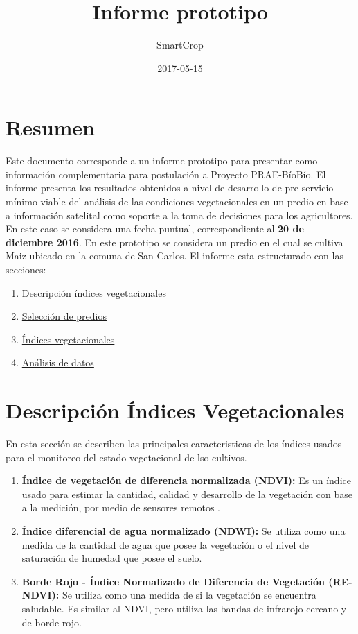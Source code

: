 \documentclass[]{report}
\title{Informe prototipo}
\author{SmartCrop}
\date{2017-05-15}
\providecommand{\tightlist}{%
  \setlength{\itemsep}{0pt}\setlength{\parskip}{0pt}}
\begin{document}
\maketitle

{
\setcounter{tocdepth}{1}
\tableofcontents
}
\chapter{Resumen}\label{resumen}

Este documento corresponde a un informe prototipo para presentar como
información complementaria para postulación a Proyecto PRAE-BíoBío. El
informe presenta los resultados obtenidos a nivel de desarrollo de
pre-servicio mínimo viable del análisis de las condiciones
vegetacionales en un predio en base a información satelital como soporte
a la toma de decisiones para los agricultores. En este caso se considera
una fecha puntual, correspondiente al \textbf{20 de diciembre 2016}. En
este prototipo se considera un predio en el cual se cultiva Maiz ubicado
en la comuna de San Carlos. El informe esta estructurado con las
secciones:

\begin{enumerate}
\def\labelenumi{\arabic{enumi}.}
\tightlist
\item
  \protect\hyperlink{DescripcionVIs}{Descripción índices vegetacionales}
\item
  \protect\hyperlink{SelecPredios}{Selección de predios}
\item
  \protect\hyperlink{indicesVeg}{Índices vegetacionales}
\item
  \protect\hyperlink{AnalisisDatos}{Análisis de datos}
\end{enumerate}

\hypertarget{DescripcionVIs}{\chapter{Descripción Índices
Vegetacionales}\label{DescripcionVIs}}

En esta sección se describen las principales caracteristicas de los
índices usados para el monitoreo del estado vegetacional de lso
cultivos.

\begin{enumerate}
\def\labelenumi{\arabic{enumi}.}
\item
  \textbf{Índice de vegetación de diferencia normalizada (NDVI):} Es un
  índice usado para estimar la cantidad, calidad y desarrollo de la
  vegetación con base a la medición, por medio de sensores remotos .
\item
  \textbf{Índice diferencial de agua normalizado (NDWI):} Se utiliza
  como una medida de la cantidad de agua que posee la vegetación o el
  nivel de saturación de humedad que posee el suelo.
\item
  \textbf{Borde Rojo - Índice Normalizado de Diferencia de Vegetación
  (RE-NDVI):} Se utiliza como una medida de si la vegetación se
  encuentra saludable. Es similar al NDVI, pero utiliza las bandas de
  infrarojo cercano y de borde rojo.
\end{enumerate}
\end{document}
